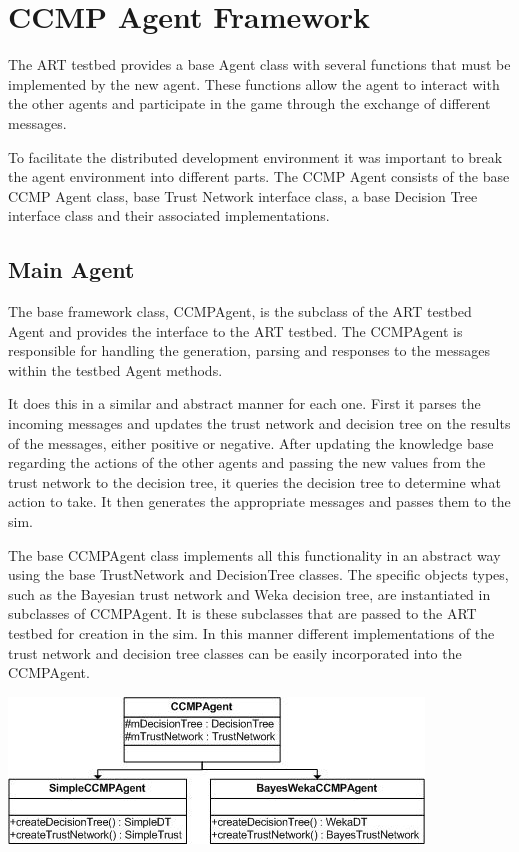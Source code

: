 \section{CCMP Agent Framework}
The ART testbed provides a base Agent class with several functions that must be
implemented by the new agent. These functions allow the agent to interact with
the other agents and participate in the game through the exchange of different
messages.  

To facilitate the distributed development environment it was important to break
the agent environment into different parts.  The CCMP Agent consists of the
base CCMP Agent class, base Trust Network interface class, a base Decision
Tree interface class and their associated implementations.

\subsection{Main Agent}
The base framework class, CCMPAgent, is the subclass of the ART testbed Agent
and provides the interface to the ART testbed.  The CCMPAgent is
responsible for handling the generation, parsing and responses to the
messages within the testbed Agent methods.  

It does this in a similar and abstract manner for each one. First it parses the
incoming messages and updates the trust network and decision tree on the
results of the messages, either positive or negative.  After updating the
knowledge base regarding the actions of the other agents and passing the new
values from the trust network to the decision tree, it queries the decision tree
to determine what action to take.  It then generates the appropriate
messages and passes them to the sim.

The base CCMPAgent class implements all this functionality in an abstract way
using the base TrustNetwork and DecisionTree classes.  The specific objects
types, such as the Bayesian trust network and Weka decision tree, are
instantiated in subclasses of CCMPAgent.  It is these subclasses that are passed
to the ART testbed for creation in the sim.  In this manner different
implementations of the trust network and decision tree classes can be easily
incorporated into the CCMPAgent.

\begin{center}
\includegraphics{images/CCMPClasses.jpg}
\end{center}

